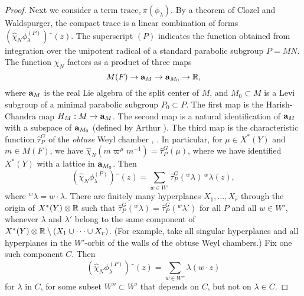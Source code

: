 \documentclass{amsart}
\newcommand\bfa{\text{\bf a}}
\begin{document}
\begin{proof}
Next we consider a term $\text{trace}_c\,\pi(\phi_\lambda)$.
By a theorem of Clozel and Waldspurger, the compact trace
is a linear combination of forms 
$(\hat\chi_N\phi_\lambda^{(P)})\hat{\phantom o}(z)$.  
The superscript $(P)$ indicates the function obtained from 
integration over the unipotent radical of a standard parabolic
subgroup $P=MN$. 
The function $\hat\chi_N$ factors as a product of three
maps
$$M(F) \to \bfa_M \to \bfa_{M_0} \to {\Bbb R},$$
where $\bfa_M$ is the real Lie algebra of the split center
of $M$, and $M_0\subset M$ is a Levi subgroup of 
a minimal parabolic subgroup $P_0\subset P$.
The first map 
is the Harish-Chandra map $H_M: M\to \bfa_M$. The second
map is a natural
identification of $\bfa_M$ with a subspace of
$\bfa_{M_0}$ (defined by Arthur \cite{A1}).
The third map is
the characteristic function $\hat\tau_P^G$ of
the {\it obtuse\/} Weyl chamber \cite{A1,p.936}, \cite{Cl2,2.1}.
In particular, for $\mu\in X^*(Y)$ and $m\in M(F)$, we have
$\hat\chi_N(m \varpi^\mu m^{-1}) = \hat\tau_P^G(\mu)$,
where we have identified
$X^*(Y)$ with a lattice in $\bfa_{M_0}$.
Then
$$(\hat\chi_N\phi_\lambda^{(P)})\hat{\phantom o} (z) = 
   \sum_{w\in W'} \hat\tau_P^G({}^w\!\lambda)\, {}^w\!\lambda(z),$$
where ${}^w\!\lambda = w\cdot\lambda$.
There are finitely many hyperplanes $X_1,\ldots,X_r$ through
the origin of $X^*(Y)\otimes {\Bbb R}$ such that
$\hat\tau_P^G({}^w\!\lambda) = \hat\tau_P^G({}^w\!\lambda')$
for all $P$ and all $w\in W'$, 
whenever $\lambda$ and $\lambda'$ belong
to the same component of $X^*(Y)\otimes {\Bbb R} \setminus
(X_1\cup\cdots\cup X_r)$.  (For example, take all
singular hyperplanes and all hyperplanes in the $W'$-orbit
of the walls of the obtuse Weyl chambers.)  Fix one
such component $C$.
Then 
$$(\hat\chi_N\phi_\lambda^{(P)})\hat{\phantom o}(z) = 
\sum_{w\in W''}\lambda(w\cdot z)$$ for $\lambda$ in $C$,
for some subset $W''\subset W'$ that depends on
$C$, but not on $\lambda\in C$.




\end{proof}
\end{document}
